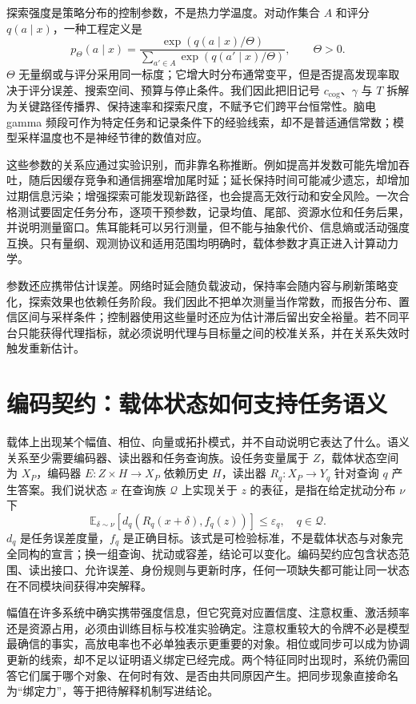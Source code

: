探索强度是策略分布的控制参数，不是热力学温度。对动作集合 $A$ 和评分 $q(a\mid x)$，一种工程定义是
\[
p_\Theta(a\mid x)=\frac{\exp(q(a\mid x)/\Theta)}{\sum_{a'\in A}\exp(q(a'\mid x)/\Theta)},\qquad \Theta>0.
\]
$\Theta$ 无量纲或与评分采用同一标度；它增大时分布通常变平，但是否提高发现率取决于评分误差、搜索空间、预算与停止条件。我们因此把旧记号 $c_{\mathrm{cog}}$、$\gamma$ 与 $T$ 拆解为关键路径传播界、保持速率和探索尺度，不赋予它们跨平台恒常性。脑电 gamma 频段可作为特定任务和记录条件下的经验线索，却不是普适通信常数；模型采样温度也不是神经节律的数值对应。

这些参数的关系应通过实验识别，而非靠名称推断。例如提高并发数可能先增加吞吐，随后因缓存竞争和通信拥塞增加尾时延；延长保持时间可能减少遗忘，却增加过期信息污染；增强探索可能发现新路径，也会提高无效行动和安全风险。一次合格测试要固定任务分布，逐项干预参数，记录均值、尾部、资源水位和任务后果，并说明测量窗口。焦耳能耗可以另行测量，但不能与抽象代价、信息熵或活动强度互换。只有量纲、观测协议和适用范围均明确时，载体参数才真正进入计算动力学。

参数还应携带估计误差。网络时延会随负载波动，保持率会随内容与刷新策略变化，探索效果也依赖任务阶段。我们因此不把单次测量当作常数，而报告分布、置信区间与采样条件；控制器使用这些量时还应为估计滞后留出安全裕量。若不同平台只能获得代理指标，就必须说明代理与目标量之间的校准关系，并在关系失效时触发重新估计。

\section{编码契约：载体状态如何支持任务语义}
\label{sec:section_5862}

载体上出现某个幅值、相位、向量或拓扑模式，并不自动说明它表达了什么。语义关系至少需要编码器、读出器和任务查询族。设任务变量属于 $Z$，载体状态空间为 $X_P$，编码器 $E:Z\times H\to X_P$ 依赖历史 $H$，读出器 $R_q:X_P\to Y_q$ 针对查询 $q$ 产生答案。我们说状态 $x$ 在查询族 $\mathcal Q$ 上实现关于 $z$ 的表征，是指在给定扰动分布 $\nu$ 下
\[
\mathbb E_{\delta\sim\nu}[d_q(R_q(x+\delta),f_q(z))]\le\varepsilon_q,
\quad q\in\mathcal Q.
\]
$d_q$ 是任务误差度量，$f_q$ 是正确目标。该式是可检验标准，不是载体状态与对象完全同构的宣言；换一组查询、扰动或容差，结论可以变化。编码契约应包含状态范围、读出接口、允许误差、身份规则与更新时序，任何一项缺失都可能让同一状态在不同模块间获得冲突解释。

幅值在许多系统中确实携带强度信息，但它究竟对应置信度、注意权重、激活频率还是资源占用，必须由训练目标与校准实验确定。注意权重较大的令牌不必是模型最确信的事实，高放电率也不必单独表示更重要的对象。相位或同步可以成为协调更新的线索，却不足以证明语义绑定已经完成。两个特征同时出现时，系统仍需回答它们属于哪个对象、在何时有效、是否由共同原因产生。把同步现象直接命名为“绑定力”，等于把待解释机制写进结论。

